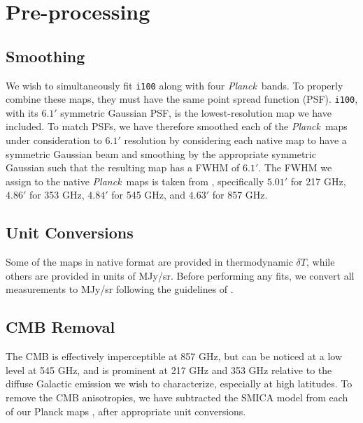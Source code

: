 \documentclass{emulateapj}
\newcommand{\PLANCK}{{\it Planck}}
\begin{document}
\section{Pre-processing}
\label{sec:prepro}

\subsection{Smoothing}
We wish to simultaneously fit \verb|i100| along with four \PLANCK~bands. To 
properly combine these maps, they must have the same point spread function 
(PSF). \verb|i100|, with its $6.1'$ symmetric Gaussian PSF, is the 
lowest-resolution map we have included. To match PSFs, we have therefore 
smoothed each of the \PLANCK~maps under consideration to $6.1'$ resolution by 
considering each native map to have a symmetric Gaussian beam and smoothing by 
the appropriate symmetric Gaussian such that the resulting map has a FWHM of 
$6.1'$. The FWHM we assign to the native \PLANCK~maps is taken from 
\cite{planckbeam}, specifically $5.01'$ for 217 GHz, $4.86'$ for 353 GHz, 
$4.84'$ for 545 GHz, and $4.63'$ for 857 GHz.

\subsection{Unit Conversions}

Some of the maps in native format are provided in thermodynamic $\delta T$, 
while others are provided in units of MJy/sr. Before performing any fits, 
we convert all measurements to MJy/sr following the guidelines of \cite{planckresponse}.


\subsection{CMB Removal}
The CMB is effectively imperceptible at 857 GHz, but can be noticed at a 
low level at 545 GHz, and is prominent at 217 GHz and 353 GHz relative 
to the diffuse Galactic emission we wish to characterize, especially at high
latitudes. To remove the CMB anisotropies, we have subtracted the SMICA model
from each of our Planck maps \citep{smica}, after appropriate unit conversions.
\end{document}
